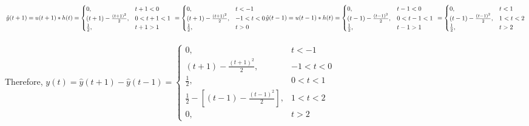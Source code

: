\documentclass[12pt]{article}
\begin{document}
    \begin{math}
      \resizebox{.9\hsize}{!}{$
      \hat{y}(t+1) = u(t+1)*h(t) = \begin{cases}
      0,& t+1 < 0\\
      (t+1) - \frac{(t+1)^{2}}{2},& 0 < t+1 <1\\
     \frac{1}{2},& t+1 > 1
    \end{cases} \ =  \begin{cases}
      0,& t < -1\\
      (t+1) - \frac{(t+1)^{2}}{2},& -1 < t < 0\\
     \frac{1}{2},& t > 0
    \end{cases}$}  \\
    \resizebox{.9\hsize}{!}{$
    \hat{y}(t-1) = u(t-1)*h(t) = \begin{cases}
      0,& t-1 < 0\\
      (t-1) - \frac{(t-1)^{2}}{2},& 0 < t-1 <1\\
     \frac{1}{2},& t-1 > 1
    \end{cases} \ =  \begin{cases}
      0,& t < 1\\
      (t-1) - \frac{(t-1)^{2}}{2},& 1 < t < 2\\
     \frac{1}{2},& t > 2
    \end{cases}$} \end{math}\\ \\
    Therefore, \begin{math} y(t) = \hat{y}(t+1) - \hat{y}(t-1) =  \begin{cases}
      0,& t < -1\\
      (t+1) - \frac{(t+1)^{2}}{2},& -1 < t < 0\\
     \frac{1}{2},& 0 < t < 1\\
     \frac{1}{2} - [(t-1) - \frac{(t-1)^{2}}{2}],& 1 < t < 2\\
     0,& t > 2
    \end{cases}  \end{math} \\
\end{document}
